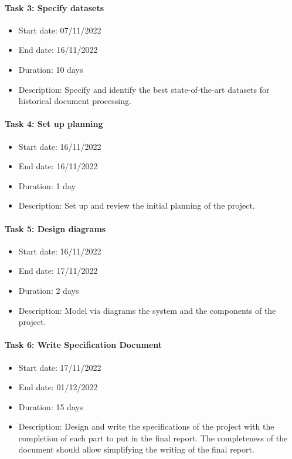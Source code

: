 \documentclass{polytech/polytech}
\numberwithin{figure}{chapter}
\begin{document}
\begin{appendix}
\paragraph{Task 3: Specify datasets}
\begin{itemize}
    \item Start date: 07/11/2022
    \item End date: 16/11/2022
    \item Duration: 10 days
    \item
        Description: Specify and identify the best state-of-the-art datasets for historical document processing.
\end{itemize}

\paragraph{Task 4: Set up planning}
\begin{itemize}
    \item Start date: 16/11/2022
    \item End date: 16/11/2022
    \item Duration: 1 day
    \item
        Description: Set up and review the initial planning of the project.
\end{itemize}

\paragraph{Task 5: Design diagrams}
\begin{itemize}
    \item Start date: 16/11/2022
    \item End date: 17/11/2022
    \item Duration: 2 days
    \item
        Description: Model via diagrams the system and the components of the project.
\end{itemize}

\paragraph{Task 6: Write Specification Document}
\begin{itemize}
    \item Start date: 17/11/2022
    \item End date: 01/12/2022
    \item Duration: 15 days
    \item
        Description: Design and write the specifications of the project with the completion of each part to put in the final report. The completeness of the document should allow simplifying the writing of the final report.
\end{itemize}


\end{appendix}
\end{document}
